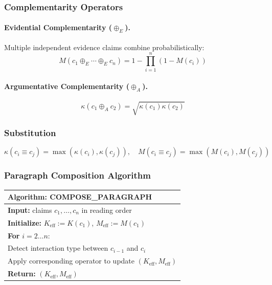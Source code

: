 \subsubsection{Complementarity Operators}

\paragraph{Evidential Complementarity ($\oplus_E$).}
Multiple independent evidence claims combine probabilistically:
\begin{equation}
M(c_1 \oplus_E \cdots \oplus_E c_n) = 1 - \prod_{i=1}^n (1 - M(c_i))
\end{equation}

\paragraph{Argumentative Complementarity ($\oplus_A$).}
\begin{equation}
\kappa(c_1 \oplus_A c_2) = \sqrt{\kappa(c_1)\kappa(c_2)}
\end{equation}

\subsubsection{Substitution}
\begin{equation}
\kappa(c_i \equiv c_j) = \max(\kappa(c_i),\kappa(c_j)), \quad
M(c_i \equiv c_j) = \max(M(c_i),M(c_j))
\end{equation}

\subsubsection{Paragraph Composition Algorithm}

\begin{table}[H]
\centering
\small
\begin{tabular}{l}
\toprule
\textbf{Algorithm: COMPOSE\_PARAGRAPH} \\
\midrule
\textbf{Input:} claims $c_1,\dots,c_n$ in reading order \\
\textbf{Initialize:} $K_{\text{eff}} := K(c_1)$, $M_{\text{eff}} := M(c_1)$ \\
\textbf{For} $i = 2 \dots n$: \\
\quad Detect interaction type between $c_{i-1}$ and $c_i$ \\
\quad Apply corresponding operator to update $(K_{\text{eff}}, M_{\text{eff}})$ \\
\textbf{Return:} $(K_{\text{eff}}, M_{\text{eff}})$ \\
\bottomrule
\end{tabular}
\end{table}


